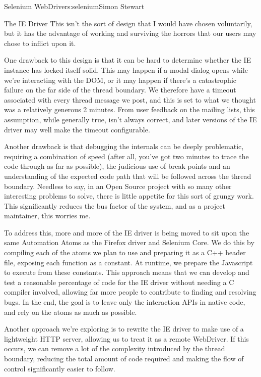 \begin{aosachapter}{Selenium WebDriver}{s:selenium}{Simon Stewart}
\begin{aosasect1}{The IE Driver}
This isn't the sort of design that I would have chosen voluntarily,
but it has the advantage of working and surviving the horrors that our
users may chose to inflict upon it.

One drawback to this design is that it can be hard to determine
whether the IE instance has locked itself solid. This may happen if a
modal dialog opens while we're interacting with the DOM, or it may
happen if there's a catastrophic failure on the far side of the thread
boundary. We therefore have a timeout associated with every thread
message we post, and this is set to what we thought was a relatively
generous 2 minutes. From user feedback on the mailing lists, this
assumption, while generally true, isn't always correct, and later
versions of the IE driver may well make the timeout configurable.

Another drawback is that debugging the internals can be deeply
problematic, requiring a combination of speed (after all, you've got
two minutes to trace the code through as far as possible), the
judicious use of break points and an understanding of the expected
code path that will be followed across the thread boundary. Needless
to say, in an Open Source project with so many other interesting
problems to solve, there is little appetite for this sort of grungy
work. This significantly reduces the bus factor of the system, and as
a project maintainer, this worries me.

To address this, more and more of the IE driver is being moved to sit
upon the same Automation Atoms as the Firefox driver and Selenium
Core. We do this by compiling each of the atoms we plan to use and
preparing it as a C++ header file, exposing each function as a
constant. At runtime, we prepare the Javascript to execute from these
constants. This approach means that we can develop and test a
reasonable percentage of code for the IE driver without needing a C
compiler involved, allowing far more people to contribute to finding
and resolving bugs. In the end, the goal is to leave only the
interaction APIs in native code, and rely on the atoms as much as
possible.

Another approach we're exploring is to rewrite the IE driver to make
use of a lightweight HTTP server, allowing us to treat it as a remote
WebDriver. If this occurs, we can remove a lot of the complexity
introduced by the thread boundary, reducing the total amount of code
required and making the flow of control significantly easier to
follow.

\end{aosasect1}


\end{aosachapter}
